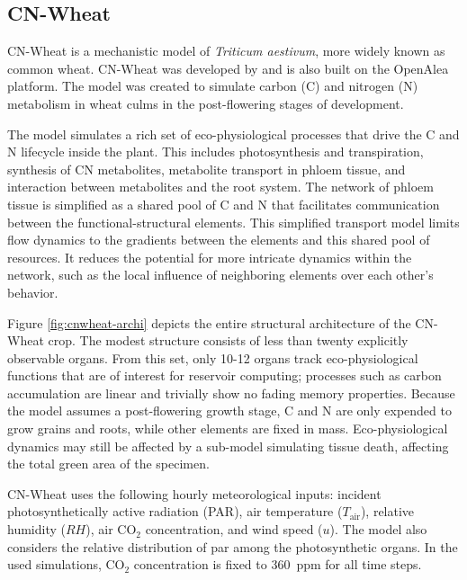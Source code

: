 \subsection{CN-Wheat}

CN-Wheat is a mechanistic model of \textit{Triticum aestivum}, more widely known as common wheat.
CN-Wheat was developed by \citet{barillot_cn-wheat_2016} and is also built on the OpenAlea platform.
The model was created to simulate carbon (C) and nitrogen (N) metabolism in wheat culms in the post-flowering stages of development.


The model simulates a rich set of eco-physiological processes that drive the C and N lifecycle inside the plant. 
This includes photosynthesis and transpiration, synthesis of CN metabolites, metabolite transport in phloem tissue, and interaction between metabolites and the root system.
The network of phloem tissue is simplified as a shared pool of C and N that facilitates communication between the functional-structural elements.
This simplified transport model limits flow dynamics to the gradients between the elements and this shared pool of resources.
It reduces the potential for more intricate dynamics within the network, such as the local influence of neighboring elements over each other's behavior.


Figure \ref{fig:cnwheat-archi} depicts the entire structural architecture of the CN-Wheat crop.
The modest structure consists of less than twenty explicitly observable organs.
From this set, only 10-12 organs track eco-physiological functions that are of interest for reservoir computing;
processes such as carbon accumulation are linear and trivially show no fading memory properties.
Because the model assumes a post-flowering growth stage, C and N are only expended to grow grains and roots, while other elements are fixed in mass.
Eco-physiological dynamics may still be affected by a sub-model simulating tissue death, affecting the total green area of the specimen.


CN-Wheat uses the following hourly meteorological inputs: incident photosynthetically active radiation (PAR), air temperature ($T_{\text{air}}$), relative humidity ($RH$), air  CO$_2$ concentration, and wind speed ($u$).
The model also considers the relative distribution of \acrshort{par} among the photosynthetic organs.
In the used simulations, CO$_2$ concentration is fixed to \SI{360}{ppm} for all time steps.


